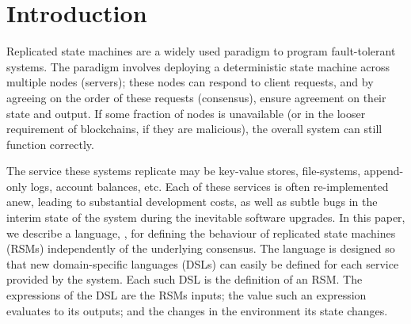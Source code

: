 \section{Introduction}
\label{s:introduction}







Replicated state machines are a widely used paradigm to program fault-tolerant
systems. The paradigm involves deploying a deterministic state machine across
multiple nodes (servers); these nodes can respond to client requests, and by
agreeing on the order of these requests (consensus), ensure agreement on their
state and output. If some fraction of nodes is unavailable (or in the looser
requirement of blockchains, if they are malicious), the overall system can
still function correctly.

The service these systems replicate may be key-value stores, file-systems,
append-only logs, account balances, etc. Each of these
services is often re-implemented anew, leading to substantial development
costs, as well as subtle bugs in the interim state of the system during the
inevitable software upgrades. In this paper, we describe a language, \rad, for
defining the behaviour of replicated state machines (RSMs) independently of the
underlying consensus. The language is designed so that new domain-specific
languages (DSLs) can easily be defined for each service provided by the system.
Each such DSL is the definition of an RSM. The expressions of the DSL
are the RSMs inputs; the value such an expression evaluates to its outputs; and
the changes in the environment its state changes.

